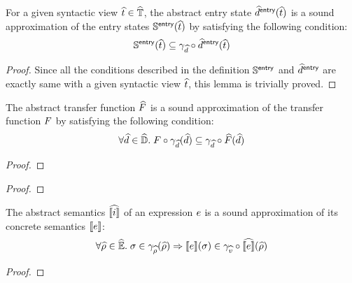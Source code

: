 \documentclass[10pt,conference]{IEEEtran}
\begin{document}
\begin{lemma}\label{lem:sound-entryaelem}
  For a given syntactic view $\widehat{t} \in \widehat{\mathbb{T}}$, the abstract entry state
  $\widehat{d}^{\textsf{entry}}(\widehat{t})$ is a sound approximation of the entry states
  $\mathbb{S}^{\textsf{entry}}(\widehat{t})$ by satisfying the following condition:
  \[
    \mathbb{S}^{\textsf{entry}}(\widehat{t}) \subseteq \gamma_{\widehat{d}} \circ \widehat{d}^{\textsf{entry}}(\widehat{t})
  \]
\end{lemma}
\begin{proof}
  Since all the conditions described in the definition $\mathbb{S}^{\textsf{entry}}$ and
  $\widehat{d}^{\textsf{entry}}$ are exactly same with a given syntactic view $\widehat{t}$, this
  lemma is trivially proved.
\end{proof}

\begin{lemma}\label{lem:sound-atransfer}
  The abstract transfer function $\widehat{F}$ is a sound approximation of the
  transfer function $F$ by satisfying the following condition:
  \[
    \forall \widehat{d} \in \widehat{\mathbb{D}}. \;
    F \circ \gamma_{\widehat{d}}(\widehat{d}) \subseteq
    \gamma_{\widehat{d}} \circ \widehat{F}(\widehat{d})
  \]
\end{lemma}
\begin{proof}
  \todo
\end{proof}

\begin{lemma}\label{lem:sound-inst}
  \todo
\end{lemma}
\begin{proof}
  \todo
\end{proof}

\begin{lemma}\label{lem:sound-inst}
  The abstract semantics $\widehat{\llbracket{i}\rrbracket}$ of an expression $e$ is a sound
  approximation of its concrete semantics $\llbracket{e}\rrbracket$:
  \[
    \forall \widehat{\rho} \in \widehat{\mathbb{E}}. \;
    \sigma \in \gamma_{\widehat{\rho}}(\widehat{\rho}) \Rightarrow
    \llbracket{e}\rrbracket(\sigma) \in \gamma_{\widehat{v}} \circ \widehat{\llbracket{e}\rrbracket}(\widehat{\rho})
  \]
\end{lemma}
\begin{proof}
  \todo
\end{proof}
\end{document}
